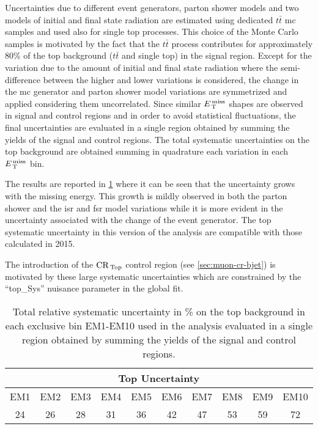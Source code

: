 Uncertainties due to different event generators, parton shower models and two
models of initial and final state radiation are estimated using dedicated
$t \bar{t}$ \gls{mc} samples and used also for single top processes. This choice
of the Monte Carlo samples is motivated by the fact that the $t \bar{t}$ process
contributes for approximately 80\% of the top background ($t \bar{t}$ and single
top) in the signal region.
Except for the variation due to the amount of initial and final state radiation
where the semi-difference between the higher and lower variations is considered,
the change in the \gls{mc} generator and parton shower model variations are
symmetrized and applied considering them uncorrelated. Since similar $E_\mathrm{\, T}^\mathrm{\, miss}$
shapes are observed in signal and control regions and in order to avoid
statistical fluctuations, the final uncertainties are evaluated in a single
region obtained by summing the yields of the signal and control regions.
The total systematic uncertainties on the top background are obtained summing in
quadrature each variation in each $E_\mathrm{\, T}^\mathrm{\, miss}$ bin.

The results are reported in \cref{tab:top_syst_2016} where it can be seen that
the uncertainty grows with the missing energy. This growth is mildly observed in
both the parton shower and the \gls{isr} and \gls{fsr} model variations while it
is more evident in the uncertainty associated with the change of the event
generator. The top systematic uncertainty in this version of the analysis are
compatible with those calculated in 2015.

The introduction of the $\mathrm{CR}_\mathrm{\, Top}$ control region (see \cref{sec:muon-cr-bjet}) is
motivated by these large systematic uncertainties which are constrained by the
``top\_Sys'' nuisance parameter in the global fit.
\begin{table}[!htb]
  \centering
  \begin{tabular}{cccccccccc}
    \toprule
    \multicolumn{10}{c}{Top Uncertainty} \\
    \midrule \midrule
    EM1 & EM2 & EM3 & EM4 & EM5 & EM6 & EM7 & EM8 & EM9 & EM10 \\
    \midrule
    24 & 26 & 28 & 31 & 36 & 42 & 47 & 53 & 59 & 72 \\
    \bottomrule
  \end{tabular}
  \caption{Total relative systematic uncertainty in \% on the top background in
    each exclusive bin EM1-EM10 used in the analysis evaluated in a single
    region obtained by summing the yields of the signal and control regions.}
  \label{tab:top_syst_2016}
\end{table}
